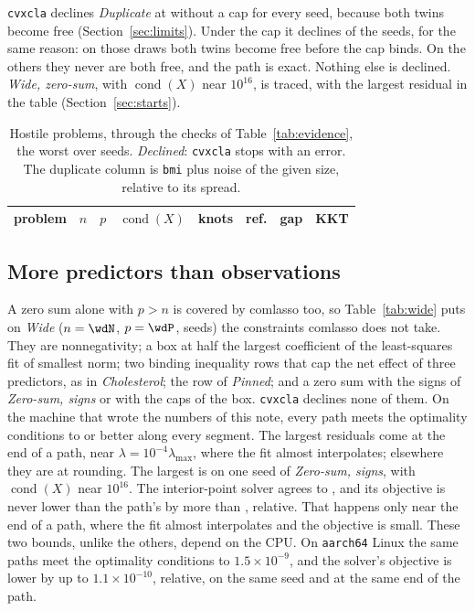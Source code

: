 \documentclass[11pt]{article}
\theoremstyle{remark}
\begin{document}
\texttt{cvxcla} declines \emph{Duplicate} at \stEpsLo{} without a cap for every seed,
because both twins become free (Section~\ref{sec:limits}). Under the cap it declines
\stDupBoxDeclined{} of the \stSeeds{} seeds, for the same reason: on those draws both
twins become free before the cap binds. On the others they never are both free, and the
path is exact. Nothing else is declined. \emph{Wide,
zero-sum}, with $\operatorname{cond}(X)$ near $10^{16}$, is traced, with the largest
residual in the table (Section~\ref{sec:starts}).

\begin{table}[!htbp]
\centering
\small\setlength{\tabcolsep}{3.5pt}
\begin{tabular}{lrrlrlcc}
\toprule
problem & $n$ & $p$ & $\operatorname{cond}(X)$ & knots & ref. & gap & KKT \\
\midrule

\end{tabular}
\caption{Hostile problems, through the checks of Table~\ref{tab:evidence}, the worst
over \stSeeds{} seeds. \emph{Declined}: \texttt{cvxcla} stops with an error. The
duplicate column is \texttt{bmi} plus noise of the given size, relative to its spread.}
\label{tab:stress}
\end{table}

\subsection{More predictors than observations}
\label{sec:wide}

A zero sum alone with $p>n$ is covered by comlasso \cite{jeon2020} too, so
Table~\ref{tab:wide} puts on \emph{Wide} ($n=\wdN$, $p=\wdP$, \stSeeds{} seeds) the
constraints comlasso does not take. They are
nonnegativity; a box at half the largest coefficient of the least-squares fit of
smallest norm; two binding inequality rows that cap the net effect of three predictors,
as in \emph{Cholesterol}; the row of \emph{Pinned}; and a zero sum with the signs of
\emph{Zero-sum, signs} or with the caps of the box. \texttt{cvxcla} declines none of
them. On the \wdMachine{} machine that wrote the numbers of this note, every path meets
the optimality conditions to \wdKKT{} or better along every segment. The largest
residuals come at the end of a path, near $\lambda=10^{-4}\lambda_{\max}$, where the fit
almost interpolates; elsewhere they are at rounding. The largest is on one seed of
\emph{Zero-sum, signs}, with $\operatorname{cond}(X)$ near $10^{16}$. The interior-point
solver agrees to \wdGap{}, and its objective is never lower than the path's by more
than \wdIpmBetter{}, relative. That happens only near the end of a path, where the fit
almost interpolates and the objective is small. These two bounds, unlike the others,
depend on the CPU. On \texttt{aarch64} Linux the same paths meet the optimality
conditions to $1.5\times10^{-9}$, and the solver's objective is lower by up to
$1.1\times10^{-10}$, relative, on the same seed and at the same end of the path.
\end{document}
